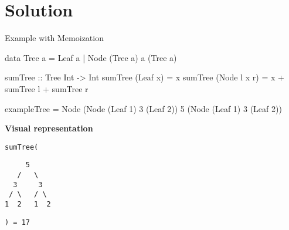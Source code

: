 \section{Solution}


\begin{slide}{Example with Memoization}
\begin{haskell}
data Tree a = Leaf a | Node (Tree a) a (Tree a)

sumTree :: Tree Int -> Int
sumTree (Leaf x)     = x
sumTree (Node l x r) = x + sumTree l + sumTree r

exampleTree = Node (Node (Leaf 1) 3 (Leaf 2)) 5 (Node (Leaf 1) 3 (Leaf 2))
\end{haskell}

\begin{center}
\textbf{Visual representation}

\begin{minipage}{.1\textwidth}
\texttt{sumTree(}
\end{minipage}
\begin{minipage}{.2\textwidth}
\begin{center}
\begin{verbatim}
     5 
   /   \
  3     3
 / \   / \
1  2   1  2
\end{verbatim}
\end{center}
\end{minipage}
\begin{minipage}{.1\textwidth}
\texttt{) = 17}
\end{minipage}
\end{center}
\end{slide}


